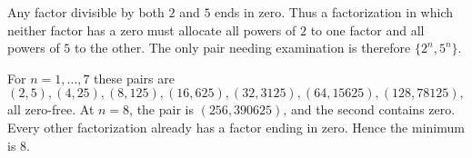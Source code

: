 Any factor divisible by both $2$ and $5$ ends in zero. Thus a factorization in which neither factor has a zero must allocate all powers of $2$ to one factor and all powers of $5$ to the other. The only pair needing examination is therefore $\{2^n,5^n\}$.

For $n=1,\ldots,7$ these pairs are
\[
(2,5),(4,25),(8,125),(16,625),(32,3125),(64,15625),(128,78125),
\]
all zero-free. At $n=8$, the pair is $(256,390625)$, and the second contains zero. Every other factorization already has a factor ending in zero. Hence the minimum is $\boxed8$.
